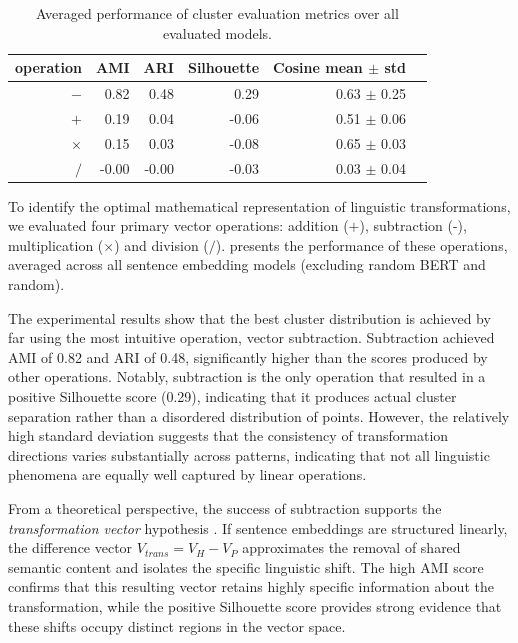 \begin{table}[tb]
    \centering
        \begin{tabular}{rrrrrr}
        \toprule
        operation & AMI & ARI & Silhouette & Cosine mean $\pm$ std \\
        \midrule
        $-$      & 0.82 & 0.48 & 0.29 & 0.63  $\pm$ 0.25 \\
        $+$      & 0.19 & 0.04 & -0.06 & 0.51 $\pm$ 0.06 \\
        $\times$ & 0.15 & 0.03 & -0.08 & 0.65 $\pm$ 0.03 \\
        $/$ &    -0.00 & -0.00 & -0.03 & 0.03  $\pm$ 0.04 \\       
        \bottomrule
        \end{tabular}
    \caption{Averaged performance of cluster evaluation metrics over all evaluated models.}
    \label{tab:mean_operations}
\end{table}

To identify the optimal mathematical representation of linguistic transformations, we evaluated four primary vector operations: addition ($+$), subtraction (-), multiplication ($\times$) and division ($/$).  presents the performance of these operations, averaged across all sentence embedding models (excluding random BERT and random).

The experimental results show that the best cluster distribution is achieved by far using the most intuitive operation, vector subtraction. Subtraction achieved AMI of 0.82 and ARI of 0.48, significantly higher than the scores produced by other operations. Notably, subtraction is the only operation that resulted in a positive Silhouette score (0.29), indicating that it produces actual cluster separation rather than a disordered distribution of points. However, the relatively high standard deviation suggests that the consistency of transformation directions varies substantially across patterns, indicating that not all linguistic phenomena are equally well captured by linear operations.

From a theoretical perspective, the success of subtraction supports the \textit{transformation vector} hypothesis \citep{mikolov-etal-2013-linguistic, VylomovaRCB15}. If sentence embeddings are structured linearly, the difference vector $V_{trans} = V_{H} - V_{P}$ approximates the removal of shared semantic content and isolates the specific linguistic shift. The high AMI score confirms that this resulting vector retains highly specific information about the transformation, while the positive Silhouette score provides strong evidence that these shifts occupy distinct regions in the vector space.
 

